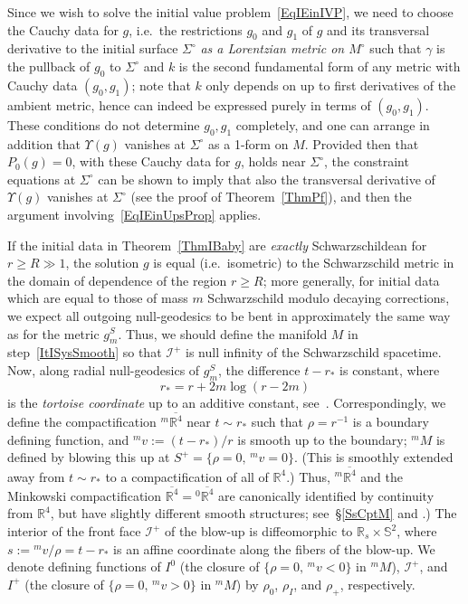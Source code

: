\documentclass[reqno,11pt,letterpaper]{amsart}
\numberwithin{equation}{section}
\numberwithin{figure}{section}
\theoremstyle{definition}
\theoremstyle{remark}
\newcommand{\ms}{\mathscr}
\newcommand{\scri}{\ms I}
\newcommand{\R}{\mathbb{R}}
\newcommand{\Sph}{\mathbb{S}}
\newcommand{\Ups}{\Upsilon}
\newcommand{\ol}{\overline}
\begin{document}
Since we wish to solve the initial value problem~\eqref{EqIEinIVP}, we need to choose the Cauchy data for $g$, i.e.\ the restrictions $g_0$ and $g_1$ of $g$ and its transversal derivative to the initial surface $\Sigma^\circ$ \emph{as a Lorentzian metric on $M^\circ$} such that $\gamma$ is the pullback of $g_0$ to $\Sigma^\circ$ and $k$ is the second fundamental form of any metric with Cauchy data $(g_0,g_1)$; note that $k$ only depends on up to first derivatives of the ambient metric, hence can indeed be expressed purely in terms of $(g_0,g_1)$. These conditions do not determine $g_0,g_1$ completely, and one can arrange in addition that $\Ups(g)$ vanishes at $\Sigma^\circ$ as a 1-form on $M$. Provided then that $P_0(g)=0$, with these Cauchy data for $g$, holds near $\Sigma^\circ$, the constraint equations at $\Sigma^\circ$ can be shown to imply that also the transversal derivative of $\Ups(g)$ vanishes at $\Sigma^\circ$ (see the proof of Theorem~\ref{ThmPf}), and then the argument involving~\eqref{EqIEinUpsProp} applies.

If the initial data in Theorem~\ref{ThmIBaby} are \emph{exactly} Schwarzschildean for $r\geq R\gg 1$, the solution $g$ is equal (i.e.\ isometric) to the Schwarzschild metric in the domain of dependence of the region $r\geq R$; more generally, for initial data which are equal to those of mass $m$ Schwarzschild modulo decaying corrections, we expect all outgoing null-geodesics to be bent in approximately the same way as for the metric $g_m^S$. Thus, we should define the manifold $M$ in step~\ref{ItISysSmooth} so that $\scri^+$ is null infinity of the Schwarzschild spacetime. Now, along radial null-geodesics of $g_m^S$, the difference $t-r_*$ is constant, where
\begin{equation}
\label{EqIEinTortoise}
  r_*=r+2 m\log(r-2 m)
\end{equation}
is the \emph{tortoise coordinate} up to an additive constant, see~\cite[Equation~(6.4.20)]{WaldGR}. Correspondingly, we define the compactification ${}^m\ol{\R^4}$ near $t\sim r_*$ such that $\rho=r^{-1}$ is a boundary defining function, and ${}^m v:=(t-r_*)/r$ is smooth up to the boundary; ${}^m\!M$ is defined by blowing this up at $S^+=\{\rho=0,\,{}^m v=0\}$. (This is smoothly extended away from $t\sim r_*$ to a compactification of all of $\R^4$.) Thus, ${}^m\ol{\R^4}$ and the Minkowski compactification $\ol{\R^4}={}^0\ol{\R^4}$ are canonically identified by continuity from $\R^4$, but have slightly different smooth structures; see~\S\ref{SsCptM} and \cite[\S7]{BaskinVasyWunschRadMink2}.) The interior of the front face $\scri^+$ of the blow-up is diffeomorphic to $\R_s\times\Sph^2$, where $s:={}^m v/\rho=t-r_*$ is an affine coordinate along the fibers of the blow-up. We denote defining functions of $I^0$ (the closure of $\{\rho=0,\,{}^m v<0\}$ in ${}^m\!M$), $\scri^+$, and $I^+$ (the closure of $\{\rho=0,\,{}^m v>0\}$ in ${}^m\!M$) by $\rho_0$, $\rho_I$, and $\rho_+$, respectively.
\end{document}
